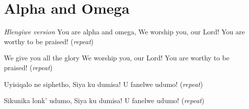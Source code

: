 \starttocol
\chapter{Alpha and Omega}
\nexttocol
\hfill{\it Hlengiwe version}
\stoptocol
\starttocol
\startlines
{\sc You} are alpha and omega,
We worship you, our Lord!
You are worthy to be praised!
          \hfill({\it repeat})~~~~~~~~~

We give you all the glory
We worship you, our Lord! 
You are worthy to be praised!
          \hfill({\it repeat})~~~~~~~~~
 
Uyisiqalo ne siphetho,
Siya ku dumisa!
U fanelwe udumo!
          \hfill({\it repeat})~~~~~~~~~


Sikunika lonk' udumo,
Siya ku dumisa!
U fanelwe udumo!
          \hfill({\it repeat})~~~~~~~~~
\stoplines
\nexttocol

\stoptocol
